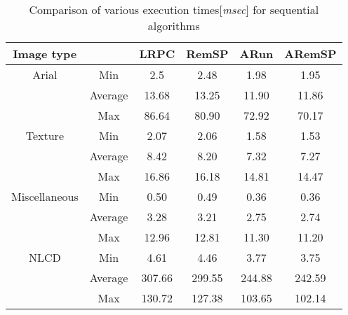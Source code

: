 \begin{table}[h]
\caption{Comparison of various execution times[{\em msec}] for sequential algorithms}
\centering
\begin{tabular}{c c c c c c} 
\hline\hline
Image type &  & LRPC & RemSP & ARun & ARemSP\\ [0.5ex] 
\hline 
Arial & Min & 2.5 & 2.48 & 1.98 & 1.95 \\ 
 & Average & 13.68 & 13.25 & 11.90 & 11.86\\
 & Max & 86.64 & 80.90 & 72.92 & 70.17 \\
[1ex]
 \hline
Texture & Min &2.07 & 2.06 & 1.58 & 1.53 \\
 & Average & 8.42 & 8.20 & 7.32 & 7.27 \\
 & Max & 16.86 & 16.18 & 14.81 & 14.47\\
[1ex]
 \hline
Miscellaneous & Min & 0.50 & 0.49 & 0.36 & 0.36\\
 & Average & 3.28 & 3.21 & 2.75 & 2.74 \\
 & Max &12.96 & 12.81 & 11.30 & 11.20\\
 [1ex]
\hline
NLCD & Min & 4.61 & 4.46	& 3.77 & 3.75 \\
& Average & 307.66 & 299.55 & 244.88 & 242.59 \\
& Max & 130.72 & 127.38 & 103.65 & 102.14 \\[1ex]
\hline
\end{tabular}
\label{table:seq} 
\end{table}
